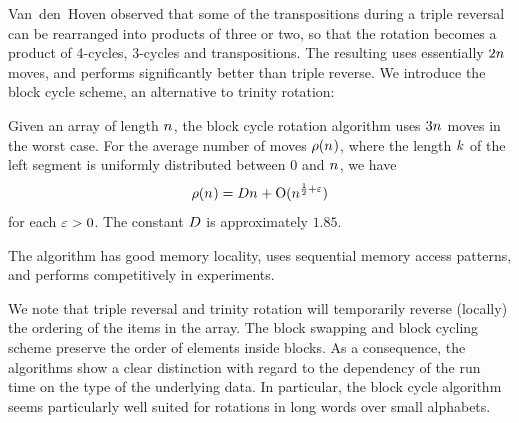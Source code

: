 
  Van~den~Hoven \cite{VanDenHoven21}   observed that some of the
  transpositions during a triple reversal can be rearranged into
  products of three or two, so that the rotation becomes a product of
  4-cycles, 3-cycles and transpositions. %
  The resulting  uses essentially
  $2n_{}$ moves, and performs significantly better than triple reverse. We introduce the block cycle scheme, an alternative to trinity
  rotation:
  \begin{main}%
    Given an array of length $n_{}$, 
    the block cycle rotation algorithm uses $3n_{}$ moves in the
    worst case. For the average number of moves $\rho(n_{})$,
    where the length $k_{}$ of the left segment is uniformly
    distributed between $0$ and $n_{}$, we have
    \[
      \rho(n_{}) =
      Dn_{} + \operatorname{O}( n_{}^{\frac12 + \varepsilon } )
    \]
    for each $\varepsilon > 0$. The constant $D$ is
    approximately $1.85$.
  \end{main}
  The algorithm has good memory locality, uses sequential memory
  access patterns, and performs competitively in experiments.

  We note that triple reversal and trinity rotation will temporarily
  reverse (locally) the ordering of the items in the array. The block
  swapping and block cycling scheme %
  preserve the
  order of elements inside blocks. As a consequence, the algorithms show
  a clear distinction with regard to the dependency of the run time on
  the type of the underlying data. %
  In particular, the block cycle algorithm seems
  particularly well suited for rotations in long words over small
  alphabets.

